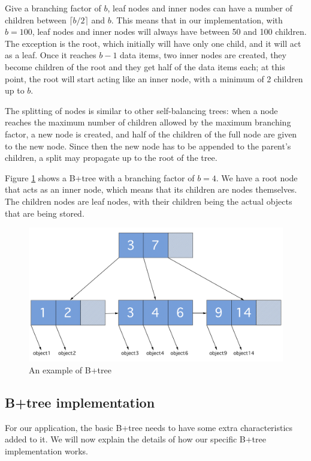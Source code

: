 Give a branching factor of $b$, leaf nodes and inner nodes can have a number of children between $\lceil b/2 \rceil$ and $b$. This means that in our implementation, with $b=100$, leaf nodes and inner nodes will always have between 50 and 100 children. The exception is the root, which initially will have only one child, and it will act as a leaf. Once it reaches $b-1$ data items, two inner nodes are created, they become children of the root and they get half of the data items each; at this point, the root will start acting like an inner node, with a minimum of 2 children up to $b$.

The splitting of nodes is similar to other self-balancing trees: when a node reaches the maximum number of children allowed by the maximum branching factor, a new node is created, and half of the children of the full node are given to the new node. Since then the new node has to be appended to the parent's children, a split may propagate up to the root of the tree.

Figure \ref{fig:B+tree} shows a B+tree with a branching factor of $b=4$. We have a root node that acts as an inner node, which means that its children are nodes themselves. The children nodes are leaf nodes, with their children being the actual objects that are being stored.

\begin{figure}[!htb]
    \centering
    \includegraphics[width=\textwidth,height=\textheight,keepaspectratio]{img/B+tree.png}
    \caption{ An example of B+tree }
    \label{fig:B+tree}
\end{figure}


\subsection{B+tree implementation}\label{sec:B+tree-implementation}
For our application, the basic B+tree needs to have some extra characteristics added to it. We will now explain the details of how our specific B+tree implementation works.


